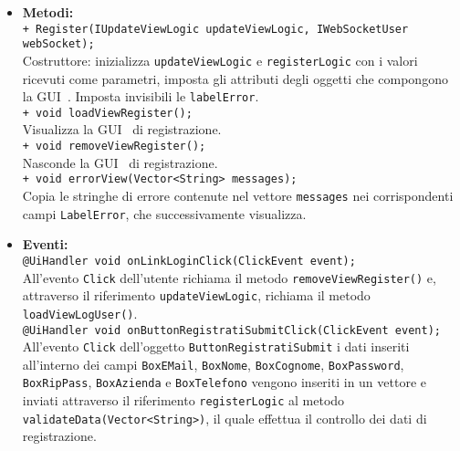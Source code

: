 {\begin{sloppypar}
{\begin{itemize}
\begin{itemize}
				\texttt{@UiField PushButton ButtonRegistratiSubmit;}\\
				Bottone per l'invio della richiesta di controllo delle credenziali relative alla registrazione.\\
				
			\item[] \textbf{Metodi:}\\
				\texttt{+ Register(IUpdateViewLogic updateViewLogic, IWebSocketUser webSocket);}\\
				Costruttore: inizializza \texttt{updateViewLogic} e \texttt{registerLogic} con i valori ricevuti come parametri, imposta gli attributi degli oggetti che compongono la GUI\g~. Imposta  invisibili le \texttt{labelError}.\\
				
				\texttt{+ void loadViewRegister();}\\
				Visualizza la GUI\g~ di registrazione.\\
				
				\texttt{+ void removeViewRegister();}\\
				Nasconde la GUI\g~ di registrazione.\\
				
				\texttt{+ void errorView(Vector<String> messages);}\\
				Copia le stringhe di errore contenute nel vettore \texttt{messages} nei corrispondenti campi \texttt{LabelError}, che successivamente visualizza.\\
				
			\item[] \textbf{Eventi:}\\
				\texttt{@UiHandler void onLinkLoginClick(ClickEvent event);}\\
				All’evento \texttt{Click} dell’utente richiama il metodo \texttt{removeViewRegister()} e, attraverso il riferimento \texttt{updateViewLogic}, richiama il metodo \texttt{loadViewLogUser()}.\\
				
				\texttt{@UiHandler void onButtonRegistratiSubmitClick(ClickEvent event);}\\
				All'evento \texttt{Click} dell'oggetto \texttt{ButtonRegistratiSubmit} i dati inseriti all'interno dei campi \texttt{BoxEMail}, \texttt{BoxNome}, \texttt{BoxCognome}, \texttt{BoxPassword}, \texttt{BoxRipPass}, \texttt{BoxAzienda} e \texttt{BoxTelefono} vengono inseriti in un vettore e inviati attraverso il riferimento \texttt{registerLogic} al metodo \texttt{validateData(Vector<String>)}, il quale effettua il controllo dei dati di registrazione.\\
		\end{itemize}
		

\end{itemize}}
\end{sloppypar}}
